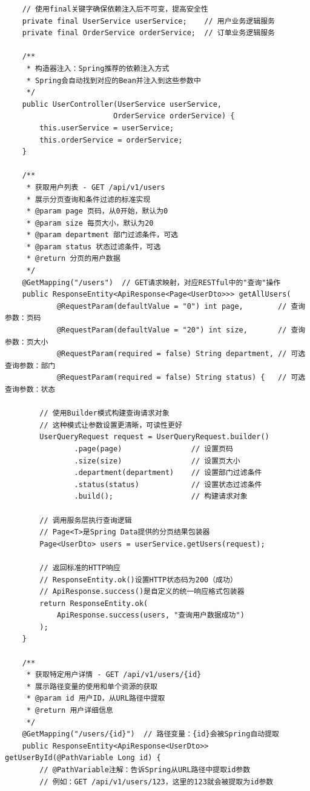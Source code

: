 \begin{lstlisting}
    // 使用final关键字确保依赖注入后不可变，提高安全性
    private final UserService userService;    // 用户业务逻辑服务
    private final OrderService orderService;  // 订单业务逻辑服务
    
    /**
     * 构造器注入：Spring推荐的依赖注入方式
     * Spring会自动找到对应的Bean并注入到这些参数中
     */
    public UserController(UserService userService, 
                         OrderService orderService) {
        this.userService = userService;
        this.orderService = orderService;
    }
    
    /**
     * 获取用户列表 - GET /api/v1/users
     * 展示分页查询和条件过滤的标准实现
     * @param page 页码，从0开始，默认为0
     * @param size 每页大小，默认为20
     * @param department 部门过滤条件，可选
     * @param status 状态过滤条件，可选
     * @return 分页的用户数据
     */
    @GetMapping("/users")  // GET请求映射，对应RESTful中的"查询"操作
    public ResponseEntity<ApiResponse<Page<UserDto>>> getAllUsers(
            @RequestParam(defaultValue = "0") int page,        // 查询参数：页码
            @RequestParam(defaultValue = "20") int size,       // 查询参数：页大小
            @RequestParam(required = false) String department, // 可选查询参数：部门
            @RequestParam(required = false) String status) {   // 可选查询参数：状态
        
        // 使用Builder模式构建查询请求对象
        // 这种模式让参数设置更清晰，可读性更好
        UserQueryRequest request = UserQueryRequest.builder()
                .page(page)                // 设置页码
                .size(size)                // 设置页大小
                .department(department)    // 设置部门过滤条件
                .status(status)            // 设置状态过滤条件
                .build();                  // 构建请求对象
                
        // 调用服务层执行查询逻辑
        // Page<T>是Spring Data提供的分页结果包装器
        Page<UserDto> users = userService.getUsers(request);
        
        // 返回标准的HTTP响应
        // ResponseEntity.ok()设置HTTP状态码为200（成功）
        // ApiResponse.success()是自定义的统一响应格式包装器
        return ResponseEntity.ok(
            ApiResponse.success(users, "查询用户数据成功")
        );
    }
    
    /**
     * 获取特定用户详情 - GET /api/v1/users/{id}
     * 展示路径变量的使用和单个资源的获取
     * @param id 用户ID，从URL路径中提取
     * @return 用户详细信息
     */
    @GetMapping("/users/{id}")  // 路径变量：{id}会被Spring自动提取
    public ResponseEntity<ApiResponse<UserDto>> getUserById(@PathVariable Long id) {
        // @PathVariable注解：告诉Spring从URL路径中提取id参数
        // 例如：GET /api/v1/users/123，这里的123就会被提取为id参数
        

\end{lstlisting}

